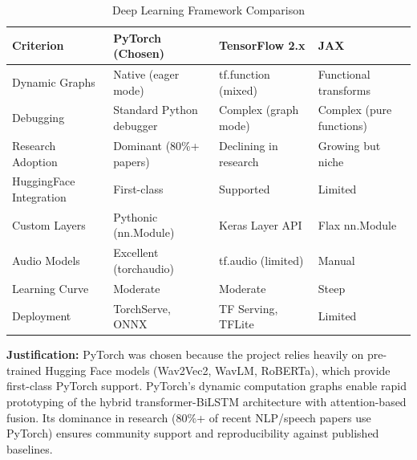 \documentclass[12pt]{article}
\begin{document}
	\begin{table}[H]
		\centering
		\caption{Deep Learning Framework Comparison}
		\small
		\begin{tabular}{|p{2.5cm}|p{2.5cm}|p{2.5cm}|p{2.5cm}|}
			\hline
			\textbf{Criterion} & \textbf{PyTorch (Chosen)} & \textbf{TensorFlow 2.x} & \textbf{JAX} \\ \hline
			Dynamic Graphs & Native (eager mode) & tf.function (mixed) & Functional transforms \\ \hline
			Debugging & Standard Python debugger & Complex (graph mode) & Complex (pure functions) \\ \hline
			Research Adoption & Dominant (80\%+ papers) & Declining in research & Growing but niche \\ \hline
			HuggingFace Integration & First-class & Supported & Limited \\ \hline
			Custom Layers & Pythonic (nn.Module) & Keras Layer API & Flax nn.Module \\ \hline
			Audio Models & Excellent (torchaudio) & tf.audio (limited) & Manual \\ \hline
			Learning Curve & Moderate & Moderate & Steep \\ \hline
			Deployment & TorchServe, ONNX & TF Serving, TFLite & Limited \\ \hline
		\end{tabular}
	\end{table}

	\textbf{Justification:} PyTorch was chosen because the project relies heavily on pre-trained Hugging Face models (Wav2Vec2, WavLM, RoBERTa), which provide first-class PyTorch support. PyTorch's dynamic computation graphs enable rapid prototyping of the hybrid transformer-BiLSTM architecture with attention-based fusion. Its dominance in research (80\%+ of recent NLP/speech papers use PyTorch) ensures community support and reproducibility against published baselines.
\end{document}
